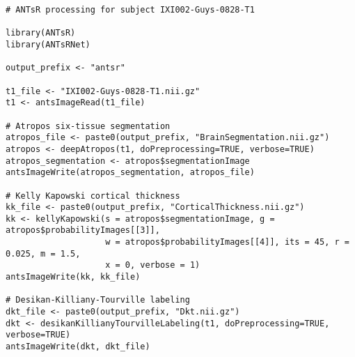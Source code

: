 \begin{lstlisting}
# ANTsR processing for subject IXI002-Guys-0828-T1

library(ANTsR)
library(ANTsRNet)

output_prefix <- "antsr"

t1_file <- "IXI002-Guys-0828-T1.nii.gz"
t1 <- antsImageRead(t1_file)

# Atropos six-tissue segmentation
atropos_file <- paste0(output_prefix, "BrainSegmentation.nii.gz")
atropos <- deepAtropos(t1, doPreprocessing=TRUE, verbose=TRUE)
atropos_segmentation <- atropos$segmentationImage
antsImageWrite(atropos_segmentation, atropos_file)

# Kelly Kapowski cortical thickness
kk_file <- paste0(output_prefix, "CorticalThickness.nii.gz")
kk <- kellyKapowski(s = atropos$segmentationImage, g = atropos$probabilityImages[[3]],
                    w = atropos$probabilityImages[[4]], its = 45, r = 0.025, m = 1.5,
                    x = 0, verbose = 1)
antsImageWrite(kk, kk_file)

# Desikan-Killiany-Tourville labeling
dkt_file <- paste0(output_prefix, "Dkt.nii.gz")
dkt <- desikanKillianyTourvilleLabeling(t1, doPreprocessing=TRUE, verbose=TRUE)
antsImageWrite(dkt, dkt_file)
\end{lstlisting}



